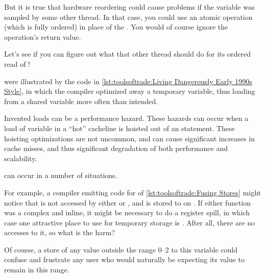 \begin{description}[labelsep=.4em]
{	But it is true that hardware reordering could cause problems if
	the  variable was sampled by some other thread.
	In that case, you could use an atomic  operation
	(which is fully ordered) in place of the .
	You would of course ignore the  operation's return
	value.

	Let's see if you can figure out what that other thread should
	do for its ordered read of !
}\QuickQuizEnd

\item[Invented loads] were illustrated by the code in
\cref{lst:toolsoftrade:Living Dangerously Early 1990s Style},
in which the compiler optimized away a temporary variable,
thus loading from a shared variable more often than intended.

Invented loads can be a performance hazard.
These hazards can occur when a load of variable in a ``hot''
cacheline is hoisted out of an  statement.
These hoisting optimizations are not uncommon, and can cause significant
increases in cache misses, and thus significant degradation of
both performance and scalability.

\item[Invented stores] can occur in a number of situations.
\begin{fcvref}
For example, a compiler emitting code for  of
\cref{lst:toolsoftrade:Fusing Stores}
might notice that  is not accessed by either
 or , and is stored to on .
If either function was a complex and inline, it might be
necessary to do a register spill, in which case one attractive
place to use for temporary storage is .
After all, there are no accesses to it, so what is the harm?

Of course, a store of any value outside the range 0--2 to this variable
could confuse and frustrate any user who would naturally be expecting
its value to remain in this range.
\end{fcvref}


\end{description}
